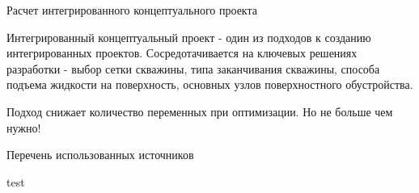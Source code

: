 \begin{frame}{Расчет интегрированного концептуального проекта}

Интегрированный концептуальный проект - один из подходов к созданию интегрированных проектов. Сосредотачивается на ключевых решениях разработки - выбор сетки скважины, типа заканчивания скважины, способа подъема жидкости на поверхность, основных узлов поверхностного обустройства.

Подход снижает количество переменных при оптимизации. Но не больше чем нужно!
    
\end{frame}

\begin{frame}{Перечень использованных источников}
\printbibliography[title=Этот цвет тоже можно поменять.]
\end{frame}


\begin{frame}{test}



    
\end{frame}